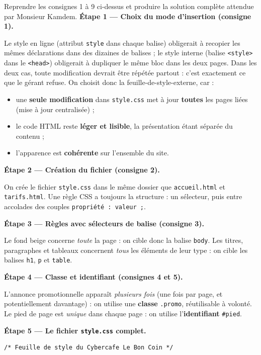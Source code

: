 \documentclass[11pt]{article}
\newcommand{\cle}[1]{{\popxbold\color{popdark}#1}}
\begin{document}
\begin{exoresolu}
Reprendre les consignes 1 à 9 ci-dessus et produire la solution complète attendue par Monsieur Kamdem.
\tcblower
\textbf{Étape 1 — Choix du mode d'insertion (consigne 1).}

Le style en ligne (attribut \texttt{style} dans chaque balise) obligerait à recopier les mêmes déclarations dans des dizaines de balises ; le style interne (balise \texttt{<style>} dans le \texttt{<head>}) obligerait à dupliquer le même bloc dans les deux pages. Dans les deux cas, toute modification devrait être répétée partout : c'est exactement ce que le gérant refuse. On choisit donc la \cle{feuille-de-style-externe}, car :
\begin{itemize}
  \item une \textbf{seule modification} dans \texttt{style.css} met à jour \textbf{toutes} les pages liées (mise à jour centralisée) ;
  \item le code HTML reste \textbf{léger et lisible}, la présentation étant séparée du contenu ;
  \item l'apparence est \textbf{cohérente} sur l'ensemble du site.
\end{itemize}

\textbf{Étape 2 — Création du fichier (consigne 2).}

On crée le fichier \texttt{style.css} dans le même dossier que \texttt{accueil.html} et \texttt{tarifs.html}. Une règle CSS a toujours la structure : un sélecteur, puis entre accolades des couples \texttt{propriété : valeur ;}.

\textbf{Étape 3 — Règles avec sélecteurs de balise (consigne 3).}

Le fond beige concerne \emph{toute} la page : on cible donc la balise \texttt{body}. Les titres, paragraphes et tableaux concernent \emph{tous} les éléments de leur type : on cible les balises \texttt{h1}, \texttt{p} et \texttt{table}.

\textbf{Étape 4 — Classe et identifiant (consignes 4 et 5).}

L'annonce promotionnelle apparaît \emph{plusieurs fois} (une fois par page, et potentiellement davantage) : on utilise une \textbf{classe} \texttt{.promo}, réutilisable à volonté. Le pied de page est \emph{unique} dans chaque page : on utilise l'\textbf{identifiant} \texttt{\#pied}.

\textbf{Étape 5 — Le fichier \texttt{style.css} complet.}

\begin{lstlisting}
/* Feuille de style du Cybercafe Le Bon Coin */


\end{lstlisting}
\end{exoresolu}
\end{document}
